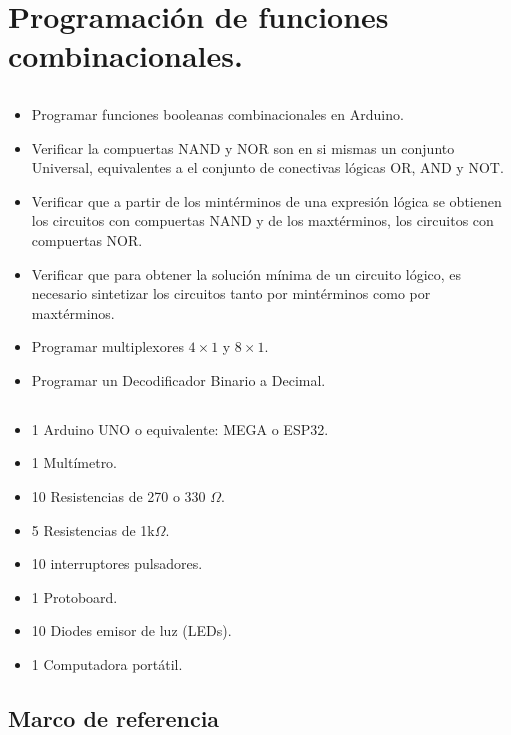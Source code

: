 \chapter{Programación de funciones combinacionales.}

\section{\obj}
\capacidad
\begin{itemize}
    \item  Programar funciones booleanas combinacionales en Arduino.
    \item  Verificar la compuertas NAND y NOR son en si mismas un conjunto Universal, equivalentes a el conjunto de conectivas lógicas OR, AND y NOT.
    \item Verificar que a partir de los mintérminos de una expresión lógica se obtienen los circuitos con compuertas NAND y de los maxtérminos, los circuitos con compuertas NOR.
    \item Verificar que para obtener la solución mínima de un circuito lógico, es necesario sintetizar los circuitos tanto por mintérminos como por maxtérminos. 
    \item Programar multiplexores $4\times1$ y $8\times1$.
    \item Programar un Decodificador Binario a Decimal.
\end{itemize} 


\section{\mat}
\begin{itemize}
    \item 1 Arduino UNO o equivalente: MEGA o ESP32.
    \item 1 Multímetro.
    \item 10 Resistencias de 270 o 330 $\Omega$.
    \item 5 Resistencias de 1k$\Omega$.
    \item 10 interruptores pulsadores.
    \item 1 Protoboard.
    \item 10 Diodes emisor de luz (LEDs).
    \item 1 Computadora portátil.
\end{itemize} 

\section{Marco de referencia}

